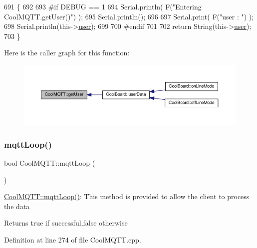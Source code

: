 \begin{DoxyCode}
691 \{
692 
693 \textcolor{preprocessor}{#if DEBUG == 1 }
694     Serial.println( F(\textcolor{stringliteral}{"Entering CoolMQTT.getUser()"}) );
695     Serial.println();
696     
697     Serial.print( F(\textcolor{stringliteral}{"user : "}) );
698     Serial.println(this->\hyperlink{class_cool_m_q_t_t_a8cd47e45d457f908d4b4390b35aaee83}{user});
699 
700 \textcolor{preprocessor}{#endif}
701 
702     \textcolor{keywordflow}{return} String(this->\hyperlink{class_cool_m_q_t_t_a8cd47e45d457f908d4b4390b35aaee83}{user});
703 \}
\end{DoxyCode}
Here is the caller graph for this function\+:\nopagebreak
\begin{figure}[H]
\begin{center}
\leavevmode
\includegraphics[width=350pt]{d0/dd0/class_cool_m_q_t_t_a373cc92fca7760d886f02d8a6e5b3f63_icgraph}
\end{center}
\end{figure}
\mbox{\label{class_cool_m_q_t_t_aa5eaae967b562b62cbcf2b8d81f6e5d5}} 
\subsubsection{\texorpdfstring{mqtt\+Loop()}{mqttLoop()}}
{\footnotesize\ttfamily bool Cool\+M\+Q\+T\+T\+::mqtt\+Loop (\begin{DoxyParamCaption}{ }\end{DoxyParamCaption})}

\hyperlink{class_cool_m_q_t_t_aa5eaae967b562b62cbcf2b8d81f6e5d5}{Cool\+M\+Q\+T\+T\+::mqtt\+Loop()}\+: This method is provided to allow the client to process the data

\begin{DoxyReturn}{Returns}
true if successful,false otherwise 
\end{DoxyReturn}


Definition at line 274 of file Cool\+M\+Q\+T\+T.\+cpp.



